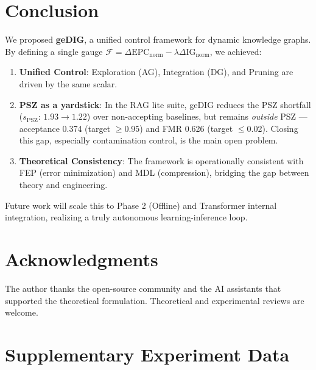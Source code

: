 \documentclass[12pt]{article}
\newcommand{\F}{\mathcal{F}}
\newcommand{\gednorm}{\Delta\mathrm{EPC}_{\mathrm{norm}}}
\newcommand{\ignorm}{\Delta\mathrm{IG}_{\mathrm{norm}}}
\begin{document}
\section{Conclusion}
We proposed \textbf{geDIG}, a unified control framework for dynamic knowledge graphs.
By defining a single gauge $\F=\gednorm-\lambda\ignorm$, we achieved:
\begin{enumerate}
    \item \textbf{Unified Control}: Exploration (AG), Integration (DG), and Pruning are driven by the same scalar.
    \item \textbf{PSZ as a yardstick}: In the RAG lite suite, geDIG reduces the PSZ shortfall ($s_{\mathrm{PSZ}}$: $1.93\to1.22$) over non-accepting baselines, but remains \emph{outside} PSZ --- acceptance 0.374 (target $\ge$0.95) and FMR 0.626 (target $\le$0.02). Closing this gap, especially contamination control, is the main open problem.
    \item \textbf{Theoretical Consistency}: The framework is operationally consistent with FEP (error minimization) and MDL (compression), bridging the gap between theory and engineering.
\end{enumerate}
Future work will scale this to Phase 2 (Offline) and Transformer internal integration, realizing a truly autonomous learning-inference loop.

\section*{Acknowledgments}
The author thanks the open-source community and the AI assistants that supported the theoretical formulation. Theoretical and experimental reviews are welcome.




\appendix

\section{Supplementary Experiment Data}
\end{document}
